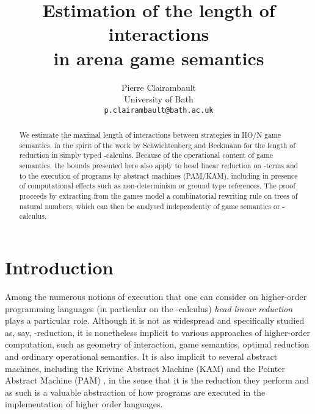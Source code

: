 \documentclass{article}
\begin{document}
\title{Estimation of the length of interactions\\ in arena game semantics}
\author{Pierre Clairambault\\
University of Bath\\
\texttt{p.clairambault@bath.ac.uk}}
\date{}
\maketitle
\begin{abstract}
We estimate the maximal length of interactions between strategies in HO/N game semantics, in the spirit of the work by Schwichtenberg and Beckmann for the length of reduction in 
simply typed -calculus.
Because of the operational content of game semantics, the bounds presented here also apply to head linear reduction on -terms and to the execution of
programs by abstract machines (PAM/KAM), including in presence of computational effects such as non-determinism or ground type references. The proof proceeds by extracting from
the games model a combinatorial rewriting rule on trees of natural numbers, which can then be analysed independently of game semantics or -calculus.
\end{abstract}



\section{Introduction}

Among the numerous notions of execution that one can consider on higher-order programming languages (in particular on the -calculus) \emph{head linear reduction} \cite{danos:abstract} plays a particular role. Although
it is not as widespread and specifically studied as, say, -reduction, it is nonetheless implicit to various approaches of higher-order computation, such as geometry of interaction, game semantics, optimal
reduction and ordinary operational semantics. It is also implicit to several abstract machines, including the Krivine Abstract Machine (KAM) \cite{krivine1985interpreteur} and the Pointer Abstract Machine (PAM) \cite{danos:abstract}, 
in the sense that it is the reduction they perform \cite{danos:abstract,phd} and as such is a valuable abstraction of how programs are executed in the implementation of higher order languages. 
\end{document}

